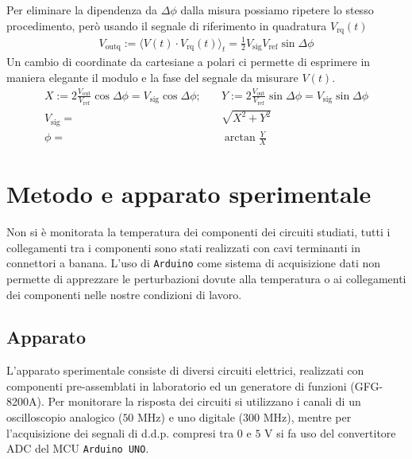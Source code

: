 \documentclass{article}[a4paper, oneside, 11pt]
\begin{document}
Per eliminare la dipendenza da $\Delta \phi$ dalla misura possiamo
ripetere lo stesso procedimento, però usando il segnale di riferimento
in quadratura $V_{\text{rq}}(t)$
\begin{align}
	V_{\text{outq}} := \langle V(t) \cdot V_{\text{rq}} (t) \rangle_t =
	\frac{1}{2} V_{\text{sig}} V_{\text{ref}}\sin{\Delta \phi}
\end{align}
Un cambio di coordinate da cartesiane a polari ci permette di esprimere in
maniera elegante il modulo e la fase del segnale da misurare $V(t)$.
\begin{align}
	X := 2 \frac{V_{\text{out}}}{V_{\text{ref}}}\cos{\Delta \phi} =
	V_{\text{sig}}\cos{\Delta \phi}; \quad
	&Y := 2 \frac{V_{\text{out}}}{V_{\text{ref}}}\sin{\Delta \phi} =
	V_{\text{sig}}\sin{\Delta \phi} \\
	V_{\text{sig}} =& \sqrt{X^2 + Y^2}\\
	\phi =& \arctan{\frac{Y}{X}}
\end{align}

\section{Metodo e apparato sperimentale}
Non si è monitorata la temperatura dei componenti dei circuiti studiati,
tutti i collegamenti tra i componenti sono stati realizzati con cavi
terminanti in connettori a banana. L'uso di \verb+Arduino+\cite{arduino}
come sistema di acquisizione dati non permette di apprezzare le perturbazioni
dovute alla temperatura o ai collegamenti dei componenti nelle nostre
condizioni di lavoro.

\subsection{Apparato}
L'apparato sperimentale consiste di diversi circuiti elettrici,
realizzati con componenti pre-assemblati in laboratorio ed un generatore di
funzioni (GFG-8200A).
Per monitorare la risposta dei circuiti si utilizzano i canali di un oscilloscopio
analogico ($50$ MHz) e uno digitale ($300$ MHz), mentre per l'acquisizione dei
segnali di d.d.p. compresi tra $0$ e $5$ V si fa uso del convertitore ADC
del MCU \verb+Arduino UNO+.
\end{document}

